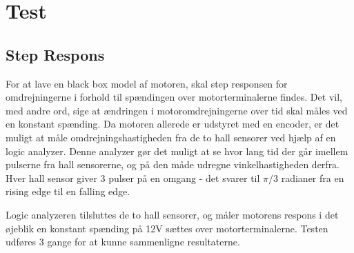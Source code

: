 \section{Test}

\subsection{Step Respons}

For at lave en black box model af motoren, skal step responsen for omdrejningerne i forhold til spændingen over motorterminalerne findes. Det vil, med andre ord, sige at ændringen i motoromdrejningerne over tid skal måles ved en konstant spænding. Da motoren allerede er udstyret med en encoder, er det muligt at måle omdrejningshastigheden fra de to hall sensorer ved hjælp af en logic analyzer. Denne analyzer gør det muligt at se hvor lang tid der går imellem pulserne fra hall sensorerne, og på den måde udregne vinkelhastigheden derfra. Hver hall sensor giver 3 pulser på en omgang - det svarer til $\pi/3$ radianer fra en rising edge til en falling edge.

Logic analyzeren tilsluttes de to hall sensorer, og måler motorens respons i det øjeblik en konstant spænding på 12V sættes over motorterminalerne. Testen udføres 3 gange for at kunne sammenligne resultaterne. 